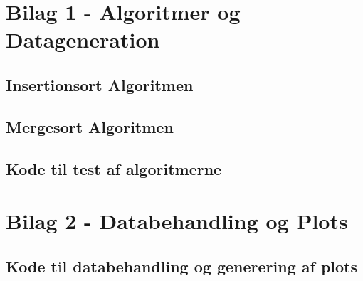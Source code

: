 \chapter*{Bilag 1 - Algoritmer og Datageneration}
\label{ch:Bilag 1}


\section*{Insertionsort Algoritmen}



\section*{Mergesort Algoritmen}



\section*{Kode til test af algoritmerne}


\chapter*{Bilag 2 - Databehandling og Plots}
\label{ch:Bilag 2}


\section*{Kode til databehandling og generering af plots}

